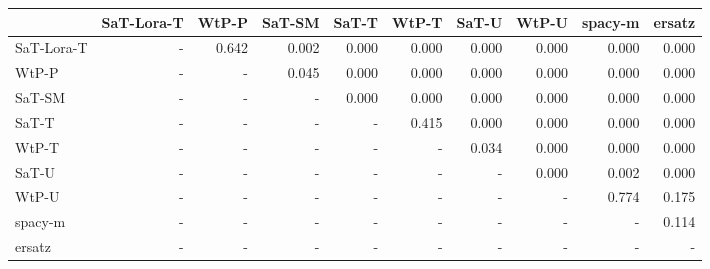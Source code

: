 \begin{tabular}{lrrrrrrrrr}
\toprule
 & SaT-Lora-T & WtP-P & SaT-SM & SaT-T & WtP-T & SaT-U & WtP-U & spacy-m & ersatz \\
\midrule
SaT-Lora-T & - & 0.642 & 0.002 & 0.000 & 0.000 & 0.000 & 0.000 & 0.000 & 0.000 \\
WtP-P & - & - & 0.045 & 0.000 & 0.000 & 0.000 & 0.000 & 0.000 & 0.000 \\
SaT-SM & - & - & - & 0.000 & 0.000 & 0.000 & 0.000 & 0.000 & 0.000 \\
SaT-T & - & - & - & - & 0.415 & 0.000 & 0.000 & 0.000 & 0.000 \\
WtP-T & - & - & - & - & - & 0.034 & 0.000 & 0.000 & 0.000 \\
SaT-U & - & - & - & - & - & - & 0.000 & 0.002 & 0.000 \\
WtP-U & - & - & - & - & - & - & - & 0.774 & 0.175 \\
spacy-m & - & - & - & - & - & - & - & - & 0.114 \\
ersatz & - & - & - & - & - & - & - & - & - \\
\bottomrule
\end{tabular}


